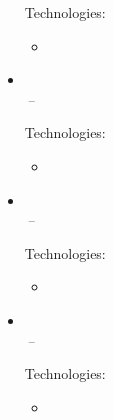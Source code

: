 \documentclass[11pt,a4paper]{article}
\begin{document}
\begin{itemize}[leftmargin=0pt,label={},itemsep=2em,topsep=0pt]
\vspace{0.2cm}
{\color{secondary}Technologies:} \BakerTechnology
\vspace{0.3cm}
\begin{itemize}[leftmargin=*,topsep=-6pt,parsep=0pt,partopsep=0pt,itemsep=0pt]
    \item \BakerShort
\end{itemize}


\item \parbox{\textwidth}{\textbf{\KempenName} \hfill \textit{\KempenLocation}}\\
\textit{\KempenSecondJobTitle} \hfill \textit{\KempenFirstJobStart\,--\,\KempenSecondJobEnd}

\vspace{0.2cm}
{\color{secondary}Technologies:} \KempenTechnology
\vspace{0.3cm}
\begin{itemize}[leftmargin=*,topsep=-6pt,parsep=0pt,partopsep=0pt,itemsep=0pt]
    \item \KempenShort
\end{itemize}


\item \parbox{\textwidth}{\textbf{\UnisysName} \hfill \textit{\UnisysLocation}}\\
\textit{\UnisysJobTitle} \hfill \textit{\UnisysJobStart\,--\,\UnisysJobEnd}

\vspace{0.2cm}
{\color{secondary}Technologies:} \UnisysTechnology
\vspace{0.3cm}
\begin{itemize}[leftmargin=*,topsep=-6pt,parsep=0pt,partopsep=0pt,itemsep=0pt]
    \item \UnisysShort
\end{itemize}


\item \parbox{\textwidth}{\textbf{\ACTName} \hfill \textit{\ACTLocation}}\\
\textit{\ACTJobTitle} \hfill \textit{\ACTJobStart\,--\,\ACTJobEnd}

\vspace{0.2cm}
{\color{secondary}Technologies:} \ACTTechnology
\vspace{0.3cm}
\begin{itemize}[leftmargin=*,topsep=-6pt,parsep=0pt,partopsep=0pt,itemsep=0pt]
    \item \ACTShort
\end{itemize}



\end{itemize}
\end{document}
